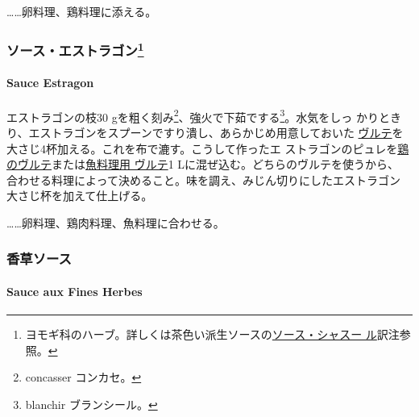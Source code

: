 \begin{recette}
\noindent\ldots{}\ldots{}卵料理、鶏料理に添える。

\maeaki

\hypertarget{ux30bdux30fcux30b9ux30a8ux30b9ux30c8ux30e9ux30b4ux30f350}{%
\subsubsection[ソース・エストラゴン]{\texorpdfstring{ソース・エストラゴン\footnote{ヨモギ科のハーブ。詳しくは茶色い派生ソースの\protect\hyperlink{sauce-chasseur}{ソース・シャスー
  ル}訳注参照。}}{ソース・エストラゴン}}\label{ux30bdux30fcux30b9ux30a8ux30b9ux30c8ux30e9ux30b4ux30f350}}

\hypertarget{sauce-estragon-blanche}{%
\paragraph{Sauce Estragon}\label{sauce-estragon-blanche}}


エストラゴンの枝30 gを粗く刻み\footnote{concasser コンカセ。}、強火で下茹でする\footnote{blanchir
  ブランシール。}。水気をしっ
かりときり、エストラゴンをスプーンですり潰し、あらかじめ用意しておいた
\protect\hyperlink{veloute}{ヴルテ}を大さじ4杯加える。これを布で漉す。こうして作ったエ
ストラゴンのピュレを\protect\hyperlink{veloute-de-volaille}{鶏のヴルテ}または\protect\hyperlink{veloute-de-poisson}{魚料理用
ヴルテ}1 Lに混ぜ込む。どちらのヴルテを使うから、
合わせる料理によって決めること。味を調え、みじん切りにしたエストラゴン
大さじ\undemi{}杯を加えて仕上げる。

\ldots{}\ldots{}卵料理、鶏肉料理、魚料理に合わせる。

\maeaki

\hypertarget{ux9999ux8349ux30bdux30fcux30b9}{%
\subsubsection{香草ソース}\label{ux9999ux8349ux30bdux30fcux30b9}}

\hypertarget{sauce-aux-fines-herbes-blanche}{%
\paragraph{Sauce aux Fines
Herbes}\label{sauce-aux-fines-herbes-blanche}}


\end{recette}
